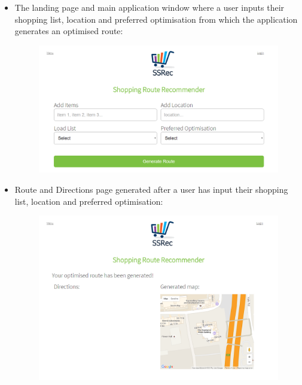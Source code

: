 \documentclass[10pt, a4paper, onecolumn]{scrartcl}
\begin{document}
\begin{itemize}
					\item The landing page and main application window where a user inputs their shopping list, location and preferred optimisation from which the application generates an optimised route:
					\begin{figure}[h!]
						\centering
						\includegraphics[scale = 0.5]{Images/index.PNG}
						\label{home page}
					\end{figure}
					
					\item Route and Directions page generated after a user has input their shopping list, location and preferred optimisation:
					\begin{figure}[h!]
						\centering
						\includegraphics[scale = 0.5]{Images/routeGen.PNG}
						\label{map page}
					\end{figure}
					

\end{itemize}
\end{document}
